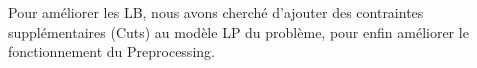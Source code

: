 \documentclass[twoside,fleqn]{EPURapport}
\begin{document}
Pour améliorer les LB, nous avons cherché d'ajouter des contraintes supplémentaires (Cuts) au modèle LP du problème, pour enfin améliorer le fonctionnement du Preprocessing.

\begin{comment}
\subsubsection{Preprocessing sur les variables booléennes de décision $X^t_{i,j}$}
Le tableau \ref{tab_pre_x} est le résultat d'un autre test sur Preprocessing. Dans ce test, au lieu de passer toutes les variables au Preprocessing, on passe seulement les variables de décision $X^t_{i,j}$, qui représente l'ordonnancement trouvé, au Preprocessing car on pense que ces variables sont les plus influentes. Par rapport au premier test, ce test ne change que les 3 dernières colonnes sur la proportion des variables fixées, le résultat sur la qualité de LB et UB reste le même.


\begin{table}[h]
    \centering
    \begin{tabular}{|c|c|c|c|}
    	\hline
    	Sc(N/M)	&  $Fix_{min}$ & $Fix_{avg}$ & $Fix_{max}$\\ \hline
    	Sc1(8/2) &0.00\% & 13.84\% & 100.00\%\\ \hline
Sc2(11/3)&0.00\% & 10.15\% & 42.42\%\\ \hline
Sc3(15/4)&0.00\% & 0.56\%  &7.36\%\\ \hline
Sc4(18/5)&0.00\% & 3.07\%  &59.07\%\\ \hline
Sc5(21/5)&0.00\% & 0.00\%  &0.00\%\\ \hline
Sc6(24/6)&0.00\% & 3.45\%  &59.07\%\\ \hline
    \end{tabular}
    \label{tab_pre_x}
    \caption{Résultat de test du Preprocessing sur les variables de décision $X^t_{i,j}$}
\end{table}
\bigskip

\subsection{Conclusion sur le Preprocessing}
En comparant le résultat détaillé des deux tests effectués, on a constaté que la plupart des variables fixées sont les variables de décision $X^t_{i,j}$. Cependant, pour certaines instances, si on passe seulement les $X^t_{i,j}$ au Preprocessing aucune variable peut être fixée mais si on passe toutes variables booléennes au Preprocessing il y aura des variables fixées. Ça veut dire il y a quand même des variables booléennes qui ne sont pas $X^t_{i,j}$ mais qui ont des effets sur le Preprocessing. En conclusion on pense que c'est mieux de faire le Preprocessin pour toutes les variables booléennes.

\end{comment}
\end{document}

